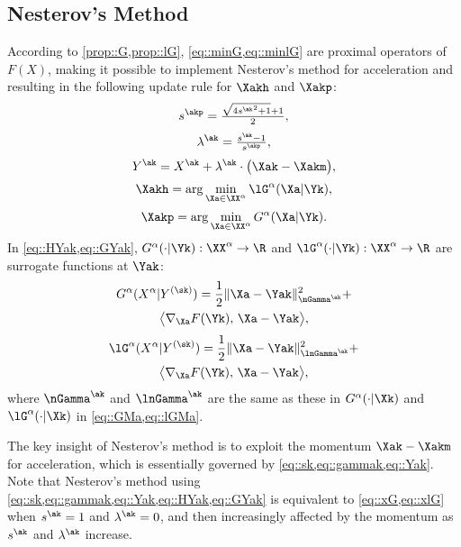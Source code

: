 \subsection{Nesterov's Method}\label{section::ammc::nesterov}
According to \cref{prop::G,prop::lG}, \cref{eq::minG,eq::minlG} are {\highlight proximal operators} of  $F(X)$, making it possible to implement Nesterov's method \cite{nesterov1983method,nesterov2013introductory} for acceleration and resulting in the following update rule for $\Xakh$ and $\Xakp$:
\begin{equation}\label{eq::sk}
	s^{\akp}=\tfrac{\sqrt{4{s^{\ak}}^2+1}+1}{2},
\end{equation}
\begin{equation}\label{eq::gammak}
	\lambda^{\ak}= \tfrac{s^{\ak}-1}{s^{\akp}},
\end{equation}
\begin{equation}\label{eq::Yak}
	Y^{\ak}= X^{\ak}+\lambda^{\ak}\cdot\big(\Xak-\Xakm\big),
\end{equation}
\begin{equation}\label{eq::HYak}
	\Xakh=\arg\min\limits_{\Xa\in\XX^\alpha }\lG^\alpha(\Xa|\Yk),
\end{equation}
\begin{equation}\label{eq::GYak}
	\Xakp=\arg\min\limits_{\Xa\in\XX^\alpha }G^\alpha(\Xa|\Yk).
\end{equation}
In \cref{eq::HYak,eq::GYak}, $G^\alpha(\cdot|\Yk):\XX^\alpha\rightarrow\R$ and $\lG^\alpha(\cdot|\Yk):\XX^\alpha\rightarrow\R$ are surrogate functions at $\Yak$:
\begin{multline}\label{eq::GXY}
	G^\alpha(X^\alpha|Y^{(\sk)}) =\frac{1}{2}\|\Xa-\Yak\|_{\nGamma^{\ak}}^2+\\
	\big\langle\nabla_{\Xa} F(\Yk),\,{\Xa-\Yak}\big\rangle,
\end{multline}
\vspace{-2em}
\begin{multline}\label{eq::lGXY}
	\lG^\alpha(X^\alpha|Y^{(\sk)}) =\frac{1}{2}\|\Xa-\Yak\|_{\lnGamma^{\ak}}^2+\\
	\big\langle\nabla_{\Xa} F(\Yk),\,{\Xa-\Yak}\big\rangle,
\end{multline}
where $\nGamma^{\ak}$ and $\lnGamma^{\ak}$  are the same as these in $G^\alpha(\cdot|\Xk)$ and $\lG^\alpha(\cdot|\Xk)$ in \cref{eq::GMa,eq::lGMa}. 

The key insight of Nesterov's method is to exploit the momentum $\Xak-\Xakm$ for acceleration, which is essentially governed by \cref{eq::sk,eq::gammak,eq::Yak}. Note that Nesterov's method using \cref{eq::sk,eq::gammak,eq::Yak,eq::HYak,eq::GYak} is  equivalent to \cref{eq::xG,eq::xlG} when $s^{\ak}=1$ and $\lambda^{\ak}=0$, and then increasingly affected by the momentum as $s^{\ak}$ and $\lambda^{\ak}$ increase.

